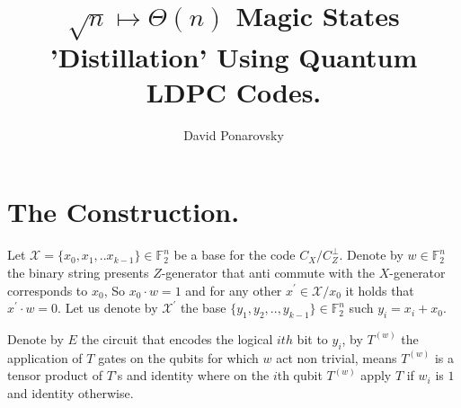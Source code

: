 \documentclass[manuscript,screen,review]{acmart}
\begin{document}

\title{ $\sqrt{n} \mapsto \Theta(n)$  Magic States 'Distillation' Using
Quantum LDPC Codes. }
\author{David Ponarovsky}
\maketitle

\newcommand*{\Mbas}{\mathcal{X}^\prime}

\section{The Construction.}

Let $\mathcal{X} = \{x_{0}, x_{1}, .. x_{k-1}\} \in \mathbb{F}_{2}^{n}$ be a
base for the code $C_{X}/C_{Z}^\perp$.  Denote by $w \in \mathbb{F}_{2}^{n}$
the binary string presents $Z$-generator that anti commute with the
$X$-generator corresponds to $x_{0}$, So $x_{0}\cdot w = 1$ and for any other
$x^\prime \in \mathcal{X}/x_{0}$ it holds that $x^{\prime}\cdot w = 0 $. Let
us denote by $\Mbas$ the base $\{ y_{1}, y_{2}, .., y_{k-1} \} \in
\mathbb{F}_{2}^{n}$ such $y_{i}= x_{i} + x_{0}$. 

Denote by $E$ the circuit
that encodes the logical $ith$ bit to $y_{i}$, by $T^{(w)}$ the application of
$T$ gates on the qubits for which $w$ act non trivial, means $T^{(w)}$ is a
tensor product of $T$'s and identity where on the $i$th qubit $T^{(w)}$ apply
$T$ if $w_{i}$ is $1$ and identity otherwise.

%

\printbibliography
\end{document}
